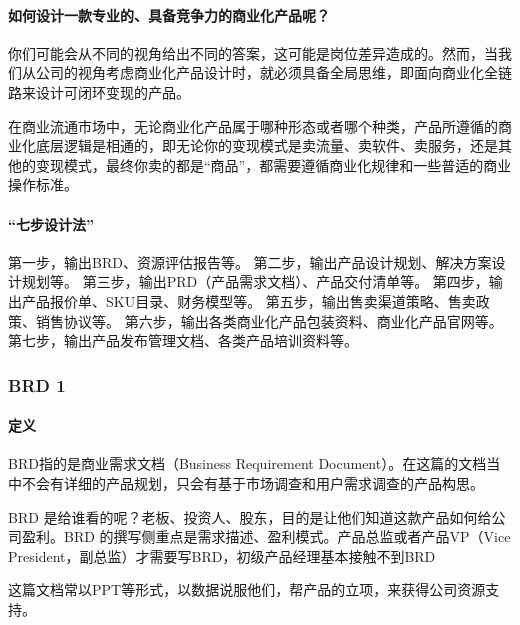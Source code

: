 \documentclass[letterpaper,11pt,english]{sphinxmanual}
\begin{document}
\paragraph{如何设计一款专业的、具备竞争力的商业化产品呢？}
\label{\detokenize{chapter_skill/7steps:id2}}
你们可能会从不同的视角给出不同的答案，这可能是岗位差异造成的。然而，当我们从公司的视角考虑商业化产品设计时，就必须具备全局思维，即面向商业化全链路来设计可闭环变现的产品。

在商业流通市场中，无论商业化产品属于哪种形态或者哪个种类，产品所遵循的商业化底层逻辑是相通的，即无论你的变现模式是卖流量、卖软件、卖服务，还是其他的变现模式，最终你卖的都是“商品”，都需要遵循商业化规律和一些普适的商业操作标准。


\paragraph{“七步设计法”}
\label{\detokenize{chapter_skill/7steps:id3}}
第一步，输出BRD、资源评估报告等。
第二步，输出产品设计规划、解决方案设计规划等。
第三步，输出PRD（产品需求文档）、产品交付清单等。
第四步，输出产品报价单、SKU目录、财务模型等。
第五步，输出售卖渠道策略、售卖政策、销售协议等。
第六步，输出各类商业化产品包装资料、商业化产品官网等。
第七步，输出产品发布管理文档、各类产品培训资料等。


\subsubsection{BRD 1\sphinxfootnotemark[142]}
\label{\detokenize{chapter_skill/BRD:brd-1}}\label{\detokenize{chapter_skill/BRD::doc}}%
\begin{footnotetext}[142]\sphinxAtStartFootnote
{}
%
\end{footnotetext}\ignorespaces 

\paragraph{定义}
\label{\detokenize{chapter_skill/BRD:id1}}
BRD指的是商业需求文档（Business Requirement
Document）。在这篇的文档当中不会有详细的产品规划，只会有基于市场调查和用户需求调查的产品构思。

BRD
是给谁看的呢？老板、投资人、股东，目的是让他们知道这款产品如何给公司盈利。BRD
的撰写侧重点是需求描述、盈利模式。产品总监或者产品VP（Vice
President，副总监）才需要写BRD，初级产品经理基本接触不到BRD

这篇文档常以PPT等形式，以数据说服他们，帮产品的立项，来获得公司资源支持。
\end{document}
